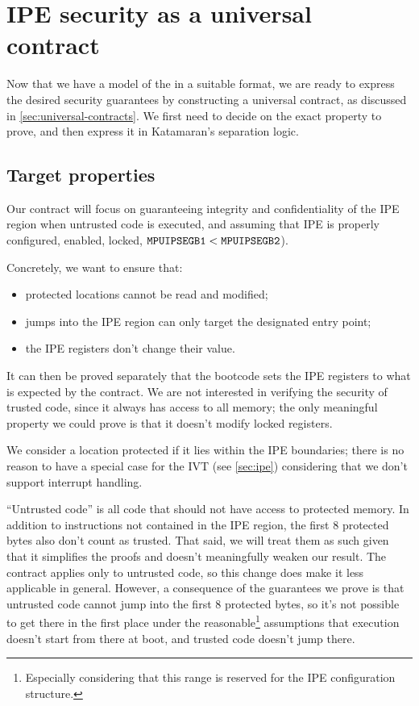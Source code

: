 \section{IPE security as a universal contract}

Now that we have a model of the \msp in a suitable format, we are ready to express the desired security guarantees by constructing a universal contract, as discussed in \cref{sec:universal-contracts}. We first need to decide on the exact property to prove, and then express it in Katamaran's separation logic.

\subsection{Target properties}
\label{sec:target-properties}

Our contract will focus on guaranteeing integrity and confidentiality of the IPE region when untrusted code is executed, and assuming that IPE is properly configured, \ie enabled, locked, \(\reg{MPUIPSEGB1} < \reg{MPUIPSEGB2}\)).

\pagebreak

\noindent
Concretely, we want to ensure that:
\begin{itemize}
\item protected locations cannot be read and modified;
\item jumps into the IPE region can only target the designated entry point;
\item the IPE registers don't change their value.
\end{itemize}

It can then be proved separately that the bootcode sets the IPE registers to what is expected by the contract. We are not interested in verifying the security of trusted code, since it always has access to all memory; the only meaningful property we could prove is that it doesn't modify locked registers.

We consider a location protected if it lies within the IPE boundaries; there is no reason to have a special case for the IVT (see \cref{sec:ipe}) considering that we don't support interrupt handling.

``Untrusted code'' is all code that should not have access to protected memory. In addition to instructions not contained in the IPE region, the first 8 protected bytes also don't count as trusted. That said, we will treat them as such given that it simplifies the proofs and doesn't meaningfully weaken our result. The contract applies only to untrusted code, so this change does make it less applicable in general. However, a consequence of the guarantees we prove is that untrusted code cannot jump into the first 8 protected bytes, so it's not possible to get there in the first place under the reasonable\footnote{Especially considering that this range is reserved for the IPE configuration structure.} assumptions that execution doesn't start from there at boot, and trusted code doesn't jump there.

